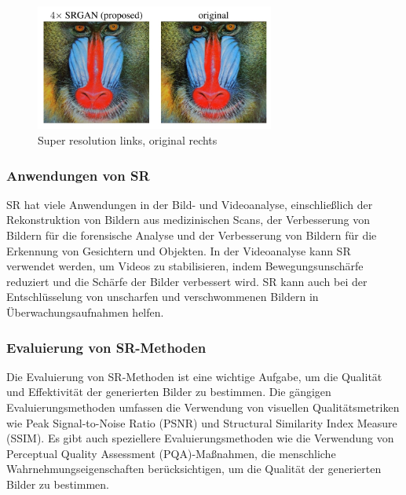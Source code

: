        \begin{figure}[h]
            \centering
            \includegraphics[width=0.7\textwidth]{img/SmartSelect_20230517_140120_Samsung Notes.jpg}
            \caption{Super resolution links, original rechts}
            \label{fig:superresolution}
        \end{figure}
        
    
    \subsubsection{Anwendungen von SR}
    
        SR hat viele Anwendungen in der Bild- und Videoanalyse, einschließlich der Rekonstruktion von Bildern aus medizinischen Scans, der Verbesserung von Bildern für die forensische Analyse und der Verbesserung von Bildern für die Erkennung von Gesichtern und Objekten.
        In der Videoanalyse kann SR verwendet werden, um Videos zu stabilisieren, indem Bewegungsunschärfe reduziert und die Schärfe der Bilder verbessert wird.      
        SR kann auch bei der Entschlüsselung von unscharfen und verschwommenen Bildern in Überwachungsaufnahmen helfen.
    
    \subsubsection{Evaluierung von SR-Methoden}
    
        Die Evaluierung von SR-Methoden ist eine wichtige Aufgabe, um die Qualität und Effektivität der generierten Bilder zu bestimmen.      
        Die gängigen Evaluierungsmethoden umfassen die Verwendung von visuellen Qualitätsmetriken wie Peak Signal-to-Noise Ratio (PSNR) und Structural Similarity Index Measure (SSIM).
        Es gibt auch speziellere Evaluierungsmethoden wie die Verwendung von Perceptual Quality Assessment (PQA)-Maßnahmen, die menschliche Wahrnehmungseigenschaften berücksichtigen, um die Qualität der generierten Bilder zu bestimmen.
    
